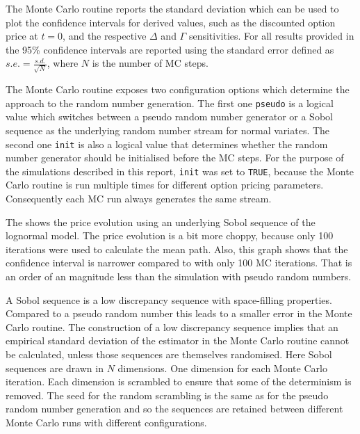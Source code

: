 \documentclass[12pt,a4paper]{article}
\begin{document}
The Monte Carlo routine reports the standard deviation which can be
used to plot the confidence intervals for derived values, such as the
discounted option price at $t=0$, and the respective $\Delta$ and
$\Gamma$ sensitivities. For all results provided in
 the 95\% confidence intervals are reported
using the standard error defined as $s.e.=\frac{s.d.}{\sqrt{N}}$, where $N$
is the number of MC steps.

The Monte Carlo routine exposes two configuration options which
determine the approach to the random number generation. The first one
\verb=pseudo= is a logical value which switches between a pseudo
random number generator or a Sobol sequence as the underlying random
number stream for normal variates. The second one \verb=init= is also
a logical value that determines whether the random number generator
should be initialised before the MC steps. For the purpose of the
simulations described in this report, \verb=init= was set to
\verb=TRUE=, because the Monte Carlo routine is run multiple times for
different option pricing parameters. Consequently each MC run always
generates the same stream.

The  shows the price evolution using an
underlying Sobol sequence of the lognormal model. The price evolution
is a bit more choppy, because only 100 iterations were used to
calculate the mean path. Also, this graph shows that the confidence
interval is narrower compared to  with only
100 MC iterations. That is an order of an magnitude less than the
simulation with pseudo random numbers.

A Sobol sequence is a low discrepancy sequence with space-filling
properties. Compared to a pseudo random number this leads to a smaller
error in the Monte Carlo routine. The construction of a low
discrepancy sequence implies that an empirical standard deviation of
the estimator in the Monte Carlo routine cannot be calculated, unless
those sequences are themselves randomised. Here Sobol sequences are
drawn in $N$ dimensions. One dimension for each Monte Carlo
iteration. Each dimension is scrambled to ensure that some of the
determinism is removed. The seed for the random scrambling is the same
as for the pseudo random number generation and so the sequences are
retained between different Monte Carlo runs with different
configurations.
\end{document}
